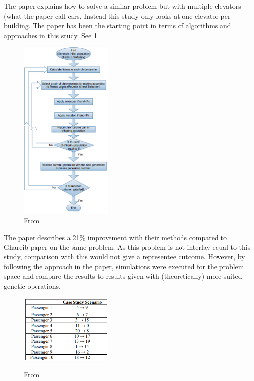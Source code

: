 
The paper\cite{tartan2016genetic} explains how to solve a similar problem but with multiple elevators (what the paper call cars. Instead this study only looks at one elevator per building. The paper has been the starting point in terms of algorithms and approaches in this study. See \ref{fig:Flow_1}

\begin{figure}[ht]
\centering
\includegraphics[width=0.4\textwidth]{diagram_1.png}
\caption{From \cite{tartan2016flow}}
	\label{fig:Flow_1}
\end{figure}
The paper describes a 21\% improvement with their methods compared to Ghareib paper \cite{gharieb2005optimal} on the same problem. As this problem is not interlay equal to this study, comparison with this would not give a representee outcome. However, by following the approach in the paper, simulations were executed for the problem space and compare the results to results given with (theoretically) more suited genetic operations.
\newpage

\begin{figure}[ht]
\centering
\includegraphics[width=0.4\textwidth]{tabel_1.png}
	\label{fig:Tabel_1}
	\caption{From \cite{ahmed2022investigation}}
\end{figure}


